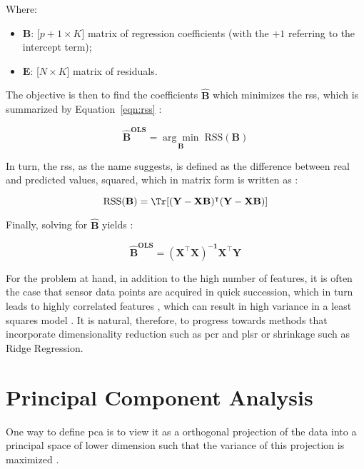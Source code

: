Where:
\begin{itemize}
	\item $\mathbf{B}$: [$p+1 \times K]$ matrix of regression coefficients (with the $+1$ referring to the intercept term);
	\item $\mathbf{E}$: [$N \times K]$ matrix of residuals.
\end{itemize}

The objective is then to find the coefficients $\mathbf{\hat{B}}$ which minimizes the \acrfull{rss}, which is summarized by Equation~\ref{eqn:rss} \parencite{friedman2001}:

\begin{equation}
	\label{eqn:betahat}
	\mathbf{\hat{B}^\text{OLS}} = \underset{\mathbf{B}}{\arg\min} 	\; \text{RSS}(\mathbf{B})
\end{equation}

In turn, the \acrshort{rss}, as the name suggests, is defined as the difference between real and predicted values, squared, which in matrix form is written as \parencite{friedman2001}:

\begin{equation} 
	\label{eqn:rss}
	\text{RSS}(\mathbf{B}) = \Tr [\mathbf{(Y-XB)^\intercal (Y-XB)}]
\end{equation}

Finally, solving for $\mathbf{\hat{B}}$ yields \parencite{friedman2001}:

\begin{equation}
	\label{eqn:ols_beta}
	\mathbf{\hat{B}^\text{OLS}} = \mathbf{(X^\intercal X)^{-1} X^\intercal Y}
\end{equation}

For the problem at hand, in addition to the high number of features, it is often the case that sensor data points are acquired in quick succession, which in turn leads to highly correlated features \parencite{Bastuck_2019}, which can result in high variance in a least squares model \parencite{friedman2001}. It is natural, therefore, to progress towards methods that incorporate dimensionality reduction such as \acrfull{pcr} and \acrfull{plsr} or shrinkage such as Ridge Regression.

\section{Principal Component Analysis}
\label{sec:pca}

One way to define \acrfull{pca} is to view it as a orthogonal projection of the data into a principal space of lower dimension such that the variance of this projection is maximized \parencite{bishop2006pattern}.


